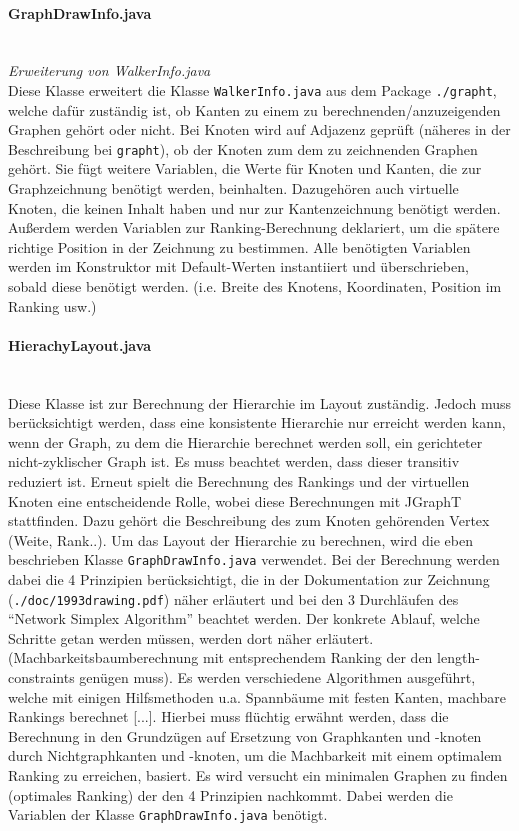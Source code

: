 \documentclass[10pt,a4paper]{article}
\begin{document}
\paragraph{GraphDrawInfo.java}\ \\
\emph{Erweiterung von WalkerInfo.java}\\
{\footnotesize Diese Klasse erweitert die Klasse \texttt{WalkerInfo.java} aus dem Package \texttt{./grapht}, welche dafür zuständig ist, ob Kanten zu einem zu berechnenden/anzuzeigenden Graphen gehört oder nicht. Bei Knoten wird auf Adjazenz geprüft (näheres in der Beschreibung bei \texttt{grapht}), ob der Knoten zum dem zu zeichnenden Graphen gehört. Sie fügt weitere Variablen, die Werte für Knoten und Kanten, die zur Graphzeichnung benötigt werden, beinhalten. Dazugehören auch virtuelle Knoten, die keinen Inhalt haben und nur zur Kantenzeichnung benötigt werden. Außerdem werden Variablen zur Ranking-Berechnung deklariert, um die spätere richtige Position in der Zeichnung zu bestimmen. Alle benötigten Variablen werden im Konstruktor mit Default-Werten instantiiert und überschrieben, sobald diese benötigt werden. (i.e. Breite des Knotens, Koordinaten, Position im Ranking usw.)}

\paragraph{HierachyLayout.java}\ \\
{\footnotesize Diese Klasse ist zur Berechnung der Hierarchie im Layout zuständig. Jedoch muss berücksichtigt werden, dass eine konsistente Hierarchie nur erreicht werden kann, wenn der Graph, zu dem die Hierarchie berechnet werden soll, ein gerichteter nicht-zyklischer Graph ist. Es muss beachtet werden, dass dieser transitiv reduziert ist. Erneut spielt die Berechnung des Rankings und der virtuellen Knoten eine entscheidende Rolle, wobei diese Berechnungen mit JGraphT stattfinden. Dazu gehört die Beschreibung des zum Knoten gehörenden Vertex (Weite, Rank..). Um das Layout der Hierarchie zu berechnen, wird die eben beschrieben Klasse \texttt{GraphDrawInfo.java} verwendet. Bei der Berechnung werden dabei die 4 Prinzipien berücksichtigt, die in der Dokumentation zur Zeichnung (\texttt{./doc/1993drawing.pdf}) näher erläutert und bei den 3 Durchläufen des "`Network Simplex Algorithm"' beachtet werden. Der konkrete Ablauf, welche Schritte getan werden müssen, werden dort näher erläutert. (Machbarkeitsbaumberechnung mit entsprechendem Ranking der den length-constraints genügen muss).  Es werden verschiedene Algorithmen ausgeführt, welche mit einigen Hilfsmethoden u.a. Spannbäume mit festen Kanten, machbare Rankings berechnet [...]. Hierbei muss flüchtig erwähnt werden, dass die Berechnung in den Grundzügen auf Ersetzung von Graphkanten und -knoten durch Nichtgraphkanten und -knoten, um die Machbarkeit mit einem optimalem Ranking zu erreichen, basiert. Es wird versucht ein minimalen Graphen zu finden (optimales Ranking) der den 4 Prinzipien nachkommt. Dabei werden die Variablen der Klasse \texttt{GraphDrawInfo.java} benötigt.} 
\end{document}

